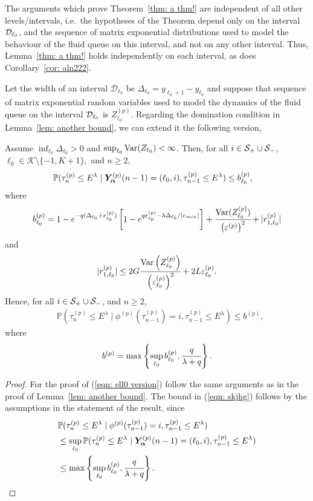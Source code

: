 The arguments which prove Theorem~\ref{thm: a thm!} are independent of all other levels/intervals, i.e.~the hypotheses of the Theorem depend only on the interval \(\mathcal{D}_{\ell_0}\), and the sequence of matrix exponential distributions used to model the behaviour of the fluid queue on this interval, and not on any other interval. Thus, Lemma~\ref{thm: a thm!} holds independently on each interval, as does Corollary~\ref{cor: aln222}.

Let the width of an interval \(\mathcal D_{\ell_0}\) be \(\Delta_{\ell_0}=y_{\ell_0+1}-y_{\ell_0}\) and suppose that sequence of matrix exponential random variables used to model the dynamics of the fluid queue on the interval \(\mathcal{D}_{\ell_0}\) is \(Z_{\ell_0}^{(p)}\). Regarding the domination condition in Lemma~\ref{lem: another bound}, we can extend it the following version, 
\begin{lem}\label{lem: another bound sdfg}
	Assume \(\inf_{\ell_0}\Delta_{\ell_0}>0\) and \(\sup_{\ell_0}\mathrm{Var}(Z_{\ell_0})<\infty\). Then, for all \(i\in\mathcal S_+\cup \mathcal{S}_-\), \(\ell_0\in\mathcal K\setminus\{-1,K+1\},\) and \(n\geq 2\), 
	\begin{align}
		&\mathbb P(\tau_n^{(p)}\leq E^\lambda \mid \bm{Y}_{\bm{\alpha}}^{(p)}(n-1) = (\ell_0,i), \tau_{n-1}^{(p)}\leq  E^\lambda ) \leq b_{\ell_0}^{(p)},\label{eqn: ell0 version}
	\end{align}
	where 
	\[b_{\ell_0}^{(p)} = 1-e^{-q(\Delta_{\ell_0}+\varepsilon_{\ell_0}^{(p)})}\left[1-e^{q\varepsilon_{\ell_0}^{(p)}-\lambda \Delta_{\ell_0}/|c_{min}|}\right] + \cfrac{\mathrm{Var}(Z_{\ell_0}^{(p)})}{\left(\varepsilon^{(p)}\right)^2} + |r_{1,\ell_0}^{(p)}| \]
	and  
	\[|r_{1,\ell_0}^{(p)}|\leq 2G\cfrac{\mathrm{Var} \left(Z_{\ell_0}^{(p)}\right)}{\left(\varepsilon_{\ell_0}^{(p)}\right)^2} + 2L\varepsilon_{\ell_0}^{(p)}.\]
	Hence, for all \(i\in\mathcal S_+\cup \mathcal{S}_-\), and \(n\geq 2\), 
	\begin{align}
		&\mathbb P(\tau_n^{(p)}\leq E^\lambda \mid \phi^{(p)}(\tau_{n-1}^{(p)})=i, \tau_{n-1}^{(p)}\leq  E^\lambda ) \leq b^{(p)}, \label{eqn: skjhg}
	\end{align}
	where 
	\[b^{(p)} = \max\left\{\sup_{\ell_0}b_{\ell_0}^{(p)}, \cfrac{q}{\lambda + q}\right\}.\]
\end{lem}
\begin{proof}
	For the proof of (\ref{eqn: ell0 version}) follow the same arguments as in the proof of Lemma~\ref{lem: another bound}. The bound in (\ref{eqn: skjhg}) follows by the assumptions in the statement of the result, since 
	\begin{align*}
		&\mathbb P(\tau_n^{(p)}\leq E^\lambda \mid \phi^{(p)}(\tau_{n-1}^{(p)})=i, \tau_{n-1}^{(p)}\leq  E^\lambda ) 
		\\&\leq \sup_{\ell_0} \mathbb P(\tau_n^{(p)}\leq E^\lambda \mid \bm{Y}_{\bm{\alpha}}^{(p)}(n-1) = (\ell_0, i), \tau_{n-1}^{(p)}\leq  E^\lambda ) 
		\\&\leq \max\left\{\sup_{\ell_0}b_{\ell_0}^{(p)}, \cfrac{q}{\lambda + q}\right\}.
	\end{align*}
\end{proof}
